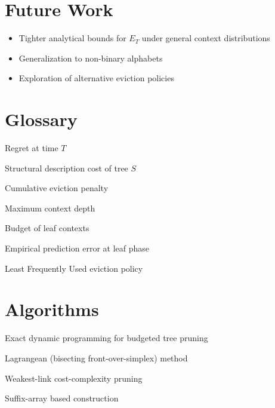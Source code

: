 \documentclass[11pt]{article}
\begin{document}
\section{Future Work}
\begin{itemize}
    \item Tighter analytical bounds for $E_T$ under general context distributions
    \item Generalization to non-binary alphabets
    \item Exploration of alternative eviction policies
\end{itemize}

\clearpage
\appendix
\section{Glossary}
\begin{description}[style=long]
    \item[$R_T$] Regret at time $T$
    \item[$\Gamma(S)$] Structural description cost of tree $S$
    \item[$E_T$] Cumulative eviction penalty
    \item[$D$] Maximum context depth
    \item[$M$] Budget of leaf contexts
    \item[$P_e$] Empirical prediction error at leaf phase
    \item[$LFU$] Least Frequently Used eviction policy
\end{description}

\section{Algorithms}
\begin{description}[style=long]
    \item[ExactDP] Exact dynamic programming for budgeted tree pruning
    \item[BFOS] Lagrangean (bisecting front-over-simplex) method
    \item[WL-pruning] Weakest-link cost-complexity pruning
    \item[SA-backend] Suffix-array based construction
\end{description}
\end{document}
